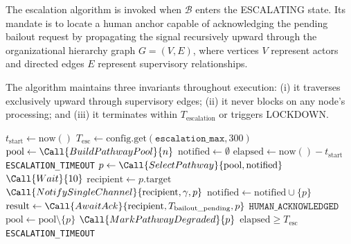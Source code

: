 The escalation algorithm is invoked when $\mathcal{B}$ enters the ESCALATING state. Its mandate is to locate a human anchor capable of acknowledging the pending bailout request by propagating the signal recursively upward through the organizational hierarchy graph $G = (V, E)$, where vertices $V$ represent actors and directed edges $E$ represent supervisory relationships.

The algorithm maintains three invariants throughout execution: (i) it traverses exclusively upward through supervisory edges; (ii) it never blocks on any node's processing; and (iii) it terminates within $T_{\text{escalation}}$ or triggers LOCKDOWN.

\begin{algorithm}[H]
\caption{Escalation Algorithm}
\label{alg:escalate}
\begin{algorithmic}[1]
    \State $t_{\text{start}} \leftarrow \text{now}()$
    \State $T_{\text{esc}} \leftarrow \text{config.get}(\texttt{escalation\_max}, 300)$
    \State $\text{pool} \leftarrow \Call{BuildPathwayPool}{n}$
    \State $\text{notified} \leftarrow \emptyset$
    \Repeat
        \State $\text{elapsed} \leftarrow \text{now}() - t_{\text{start}}$
            \State {}
            \State \Return \texttt{ESCALATION\_TIMEOUT}
        \EndIf
        \State $p \leftarrow \Call{SelectPathway}{\text{pool}, \text{notified}}$
            \State {}
            \State $\Call{Wait}{10}$
            \State \Continue
        \EndIf
        \State $\text{recipient} \leftarrow p.\text{target}$
        \State $\Call{NotifySingleChannel}{\text{recipient}, \gamma, p}$
        \State $\text{notified} \leftarrow \text{notified} \cup \{p\}$
        \State $\text{result} \leftarrow \Call{AwaitAck}{\text{recipient}, T_{\text{bailout\_pending}}, p}$
            \State \Return $\texttt{HUMAN\_ACKNOWLEDGED}$
            \State $\text{pool} \leftarrow \text{pool} \setminus \{p\}$
            \State $\Call{MarkPathwayDegraded}{p}$
        \EndIf
    \Until $\text{elapsed} \geq T_{\text{esc}}$
    \State {}
    \State \Return \texttt{ESCALATION\_TIMEOUT}
\EndFunction

\State


\end{algorithmic}
\end{algorithm}
